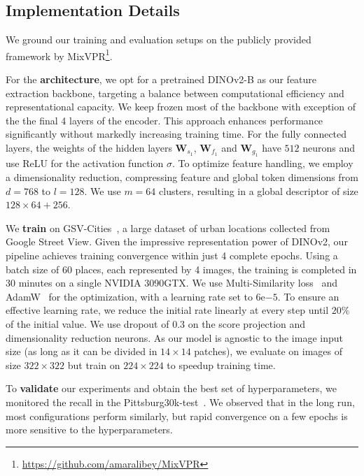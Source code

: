 \documentclass[10pt,twocolumn,letterpaper]{article}
\begin{document}
\subsection{Implementation Details}
\label{subsec:implementation}

We ground our training and evaluation setups on the publicly provided framework by MixVPR\footnote{\url{https://github.com/amaralibey/MixVPR}}. 

For the \textbf{architecture}, we opt for a pretrained \mbox{DINOv2-B} as our feature extraction backbone, targeting a balance between computational efficiency and representational capacity. We keep frozen most of the backbone with exception of the the final 4 layers of the encoder. This approach enhances performance significantly without markedly increasing training time. For the fully connected layers, the weights of the hidden layers $\mathbf{W}_{s_1}$, $\mathbf{W}_{f_1}$ and $\mathbf{W}_{g_1}$ have $512$ neurons and use ReLU for the activation function $\sigma$. 
To optimize feature handling, we employ a dimensionality reduction, compressing feature and global token dimensions from $d=768$ to $l=128$. We use $m=64$ clusters, resulting in a global descriptor of size $128 \times 64 + 256$.

We \textbf{train} on GSV-Cities~\cite{ali2022gsv}, a large dataset of urban locations collected from Google Street View. Given the impressive representation power of DINOv2, our pipeline achieves training convergence within just 4 complete epochs. Using a batch size of 60 places, each represented by 4 images, the training is completed in 30 minutes on a single NVIDIA 3090GTX. We use Multi-Similarity loss~\cite{wang2019multi} and AdamW~\cite{loshchilov2017decoupled} for the optimization, with a learning rate set to $6\mathrm{e}{-5}$. To ensure an effective learning rate, we reduce the initial rate linearly at every step until $20\%$ of the initial value. We use dropout of $0.3$ on the score projection and dimensionality reduction neurons. As our model is agnostic to the image input size (as long as it can be divided in $14\times 14$ patches), we evaluate on images of size $322\times322$ but train on $224\times224$ to speedup training time.

To \textbf{validate} our experiments and obtain the best set of hyperparameters, we monitored the recall in the Pittsburg30k-test~\cite{torii2013visual}. We observed that in the long run, most configurations perform similarly, but rapid convergence on a few epochs is more sensitive to the hyperparameters.
\end{document}
